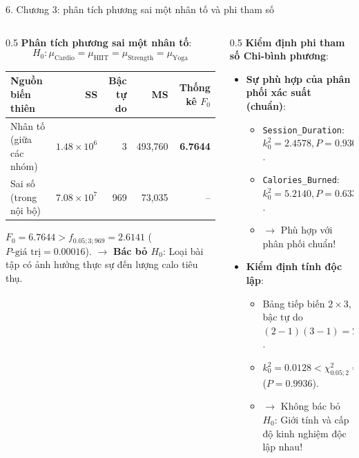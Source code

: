 \documentclass[aspectratio=169, 10pt]{beamer}
\begin{document}
\begin{frame}{6. Chương 3: phân tích phương sai một nhân tố và phi tham số}
    \begin{columns}
        \begin{column}{0.5\textwidth}
            \textbf{Phân tích phương sai một nhân tố}:
            \[ H_0: \mu_{\text{Cardio}} = \mu_{\text{HIIT}} = \mu_{\text{Strength}} = \mu_{\text{Yoga}} \]
            \begin{table}[H]
            \centering\scriptsize
            \begin{tabular}{lrrrr}
            \toprule
            \textbf{Nguồn biến thiên} & \textbf{SS} & \textbf{Bậc tự do} & \textbf{MS} & \textbf{Thống kê $F_0$} \\
            \midrule
            Nhân tố (giữa các nhóm) & $1.48 \times 10^6$ & 3 & 493,760 & \textbf{6.7644} \\
            Sai số (trong nội bộ) & $7.08 \times 10^7$ & 969 & 73,035 & -- \\
            \bottomrule
            \end{tabular}
            \end{table}
            $F_0 = 6.7644 > f_{0.05; 3; 969} = 2.6141$ ($P\text{-giá trị} = 0.00016$).
            $\rightarrow$ \textbf{Bác bỏ $H_0$}: Loại bài tập có ảnh hưởng thực sự đến lượng calo tiêu thụ.
        \end{column}
        \begin{column}{0.5\textwidth}
            \textbf{Kiểm định phi tham số Chi-bình phương}:
            \begin{itemize}
                \item \textbf{Sự phù hợp của phân phối xác suất (chuẩn)}:
                \begin{itemize}
                    \item \texttt{Session\_Duration}: $k_0^2 = 2.4578, P = 0.9303 > 0.05$.
                    \item \texttt{Calories\_Burned}: $k_0^2 = 5.2140, P = 0.6338 > 0.05$.
                    \item $\rightarrow$ Phù hợp với phân phối chuẩn!
                \end{itemize}
                \item \textbf{Kiểm định tính độc lập}:
                \begin{itemize}
                    \item Bảng tiếp biến $2 \times 3$, bậc tự do $(2-1)(3-1) = 2$.
                    \item $k_0^2 = 0.0128 < \chi^2_{0.05; 2} = 5.9915$ ($P = 0.9936$).
                    \item $\rightarrow$ Không bác bỏ $H_0$: Giới tính và cấp độ kinh nghiệm độc lập nhau!
                \end{itemize}
            \end{itemize}
        \end{column}
    \end{columns}
\end{frame}
\end{document}
